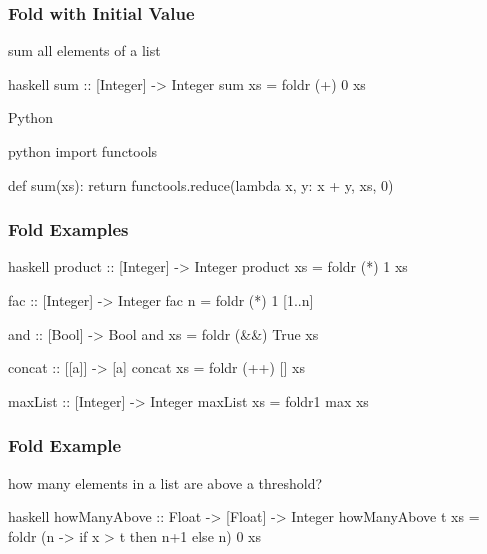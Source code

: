 \documentclass[dvipsnames]{beamer}
\theoremstyle{plain}
\begin{document}
\begin{frame}[fragile]
  \frametitle{Fold with Initial Value}

  \begin{exampleblock}{sum all elements of a list}
    \begin{pygments}{haskell}
sum :: [Integer] -> Integer
sum xs = foldr (+) 0 xs
    \end{pygments}
  \end{exampleblock}

  \bigskip
  \begin{exampleblock}{Python}
    \begin{pygments}{python}
import functools

def sum(xs):
  return functools.reduce(lambda x, y: x + y, xs, 0)
    \end{pygments}
  \end{exampleblock}
\end{frame}

\begin{frame}[fragile]
  \frametitle{Fold Examples}

  \begin{exampleblock}{}
    \begin{pygments}{haskell}
product :: [Integer] -> Integer
product xs = foldr (*) 1 xs

fac :: [Integer] -> Integer
fac n = foldr (*) 1 [1..n]

and :: [Bool] -> Bool
and xs = foldr (&&) True xs

concat :: [[a]] -> [a]
concat xs = foldr (++) [] xs

maxList :: [Integer] -> Integer
maxList xs = foldr1 max xs
    \end{pygments}
  \end{exampleblock}
\end{frame}

\begin{frame}[fragile]
  \frametitle{Fold Example}

  \begin{exampleblock}{how many elements in a list are above a threshold?}
    \begin{pygments}{haskell}
howManyAbove :: Float -> [Float] -> Integer
howManyAbove t xs =
    foldr (\x n -> if x > t then n+1 else n) 0 xs
    \end{pygments}
  \end{exampleblock}
\end{frame}
\end{document}
